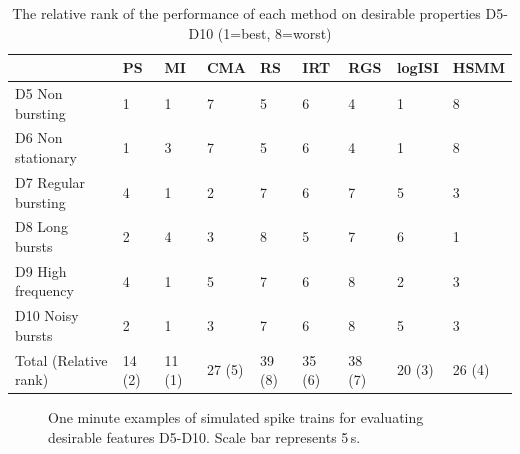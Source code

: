 \documentclass[12pt, titlepage]{article}
\begin{document}
		\begin{table}
			\centering \begin{tabular}{|l|llllllll|}
				\hline
				& PS & MI & CMA & RS & IRT & RGS & logISI & HSMM
				\\ \hline \rowcolor{Gray} D5 Non bursting & 1 & 1 & 7 & 5 & 6 & 4 & 1 &  8
				\\D6 Non stationary & 1 & 3 & 7 & 5 & 6 & 4 & 1 & 8 
				\\ \rowcolor{Gray}D7 Regular bursting & 4 & 1 & 2 & 7 & 6 & 7 & 5 & 3
				\\ D8 Long bursts & 2 & 4 & 3 & 8 & 5 & 7 & 6 & 1
				\\ \rowcolor{Gray} D9 High frequency & 4 & 1 & 5 & 7 & 6 & 8 & 2 & 3
				\\ D10 Noisy bursts & 2 & 1 & 3 & 7 & 6 & 8 & 5 & 3
				\\ \hline  \rowcolor{Gray} Total (Relative rank) & 14 (2) & 11 (1) & 27 (5) & 39 (8) & 35 (6) & 38 (7) & 20 (3) & 26 (4)
				\\ \hline
			\end{tabular}
			\caption{The relative rank of the performance of each method on desirable properties D5-D10 (1=best, 8=worst)} \label{des_results2}
		\end{table}		
		\begin{figure}[h]
			\centering
			\caption{One minute examples of simulated spike trains for evaluating desirable features D5-D10. Scale bar represents 5$\,$s.}
			\label{sim_egs}
		\end{figure}
\end{document}
